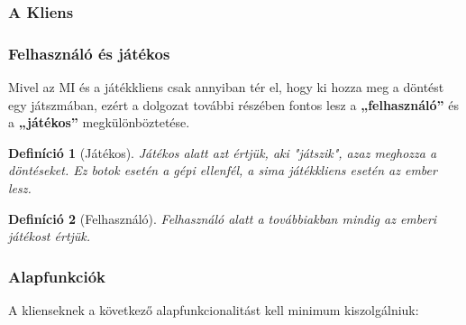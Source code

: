 \documentclass[twoside, a4paper, 12pt]{article}
\newtheorem{definition}{Definíció}
\begin{document}
\subsubsection{A Kliens}

\subsubsection{Felhasználó és játékos}

Mivel az MI és a játékkliens csak annyiban tér el, hogy ki hozza meg a döntést egy játszmában, ezért a dolgozat további részében fontos lesz a \textbf{„felhasználó”} és a \textbf{„játékos”} megkülönböztetése.

\begin{definition}[Játékos]
Játékos alatt azt értjük, aki "játszik", azaz meghozza a döntéseket. Ez botok esetén a gépi ellenfél, a sima játékkliens esetén az ember lesz.
\end{definition}

\begin{definition}[Felhasználó]
Felhasználó alatt a továbbiakban mindig az emberi \textit{játékost} értjük.
\end{definition}

\subsubsection{Alapfunkciók}
A klienseknek a következő alapfunkcionalitást kell minimum kiszolgálniuk:
\end{document}
